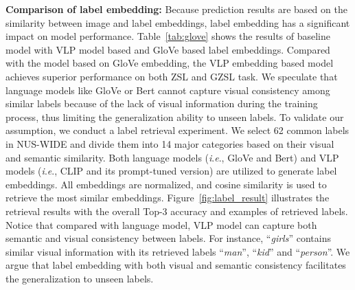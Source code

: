 \documentclass[letterpaper]{article} %
\newcommand{\ie}{\textit{i}.\textit{e}.}
\begin{document}
\noindent\textbf{Comparison of label embedding:}
Because prediction results are based on the similarity between image and label embeddings, label embedding has a significant impact on model performance.
Table~\ref{tab:glove} shows the results of baseline model with VLP model based and GloVe based label embeddings.
Compared with the model based on GloVe embedding, the VLP embedding based model achieves superior performance on both ZSL and GZSL task.
We speculate that language models like GloVe or Bert cannot capture visual consistency among similar labels because of the lack of visual information during the training process, thus limiting the generalization ability to unseen labels.
To validate our assumption, we conduct a label retrieval experiment.
We select 62 common labels in NUS-WIDE and divide them into 14 major categories based on their visual and semantic similarity.
Both language models (\ie, GloVe and Bert) and VLP models (\ie, CLIP and its prompt-tuned version) are utilized to generate label embeddings.
All embeddings are normalized, and cosine similarity is used to retrieve the most similar embeddings.
Figure~\ref{fig:label_result} illustrates the retrieval results with the overall Top-3 accuracy and examples of retrieved labels.
Notice that compared with language model, VLP model can capture both semantic and visual consistency between labels.
For instance, ``\textit{girls}'' contains similar visual information with its retrieved labels ``\textit{man}'', ``\textit{kid}'' and ``\textit{person}''.
We argue that label embedding with both visual and semantic consistency facilitates the generalization to unseen labels.





\end{document}
